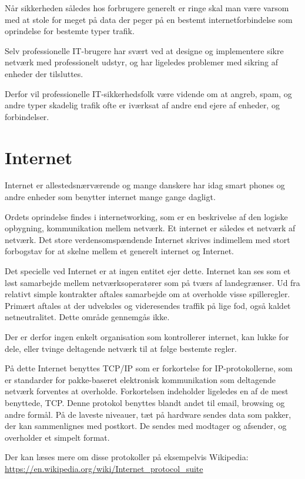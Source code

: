 \documentclass[a4paper,11pt,notitlepage]{report}
\begin{document}
Når sikkerheden således hos forbrugere generelt er ringe skal man være varsom med at stole for meget på data der peger på en bestemt internetforbindelse som oprindelse for bestemte typer trafik.

Selv professionelle IT-brugere har svært ved at designe og implementere sikre netværk med professionelt udstyr, og har ligeledes problemer med sikring af enheder der tilsluttes.

Derfor vil professionelle IT-sikkerhedsfolk være vidende om at angreb, spam, og andre typer skadelig trafik ofte er iværksat af andre end ejere af enheder, og forbindelser.


\chapter{Internet}

Internet er allestedsnærværende og mange danskere har idag smart phones og andre enheder som benytter internet mange gange dagligt.

Ordets oprindelse findes i internetworking, som er en beskrivelse af den logiske opbygning, kommunikation mellem netværk. Et internet er således et netværk af netværk. Det store verdensomspændende Internet skrives indimellem med stort forbogstav for at skelne mellem et generelt internet og Internet.

Det specielle ved Internet er at ingen entitet ejer dette. Internet kan ses som et løst samarbejde mellem netværksoperatører som på tværs af landegrænser. Ud fra relativt simple kontrakter aftales samarbejde om at overholde visse spilleregler. Primært aftales at der udveksles og videresendes traffik på lige fod, også kaldet netneutralitet. Dette område gennemgås ikke.

Der er derfor ingen enkelt organisation som kontrollerer internet, kan lukke for dele, eller tvinge deltagende netværk til at følge bestemte regler.

På dette Internet benyttes TCP/IP som er forkortelse for IP-protokollerne, som er standarder for pakke-baseret elektronisk kommunikation som deltagende netværk forventes at overholde. Forkortelsen indeholder ligeledes en af de mest benyttede, TCP. Denne protokol benyttes blandt andet til email, browsing og andre formål. På de laveste niveauer, tæt på hardware sendes data som pakker, der kan sammenlignes med postkort. De sendes med modtager og afsender, og overholder et simpelt format.

Der kan læses mere om disse protokoller på eksempelvis Wikipedia:\\ \url{https://en.wikipedia.org/wiki/Internet_protocol_suite}
\end{document}
